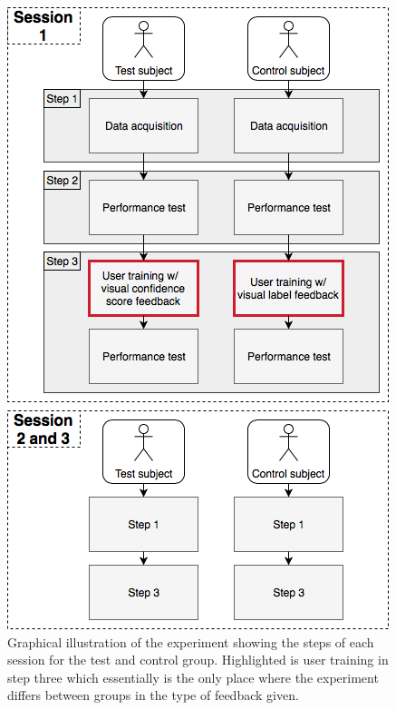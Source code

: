 \begin{figure}[H]                                         
	\includegraphics[width=.64\textwidth]{figures/pMethods/Study_design}  
	\caption{Graphical illustration of the experiment showing the steps of each session for the test and control group. Highlighted is user training in step three which essentially is the only place where the experiment differs between groups in the type of feedback given.}
	\label{fig:std} 
\end{figure}   


